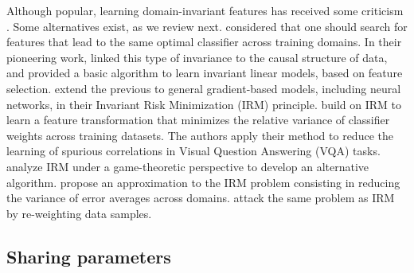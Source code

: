 \documentclass{article}
\begin{document}
Although popular, learning domain-invariant features has received some criticism \citep{zhao2019learning, johansson2019support}. Some alternatives exist, as we review next.
%
\citet{peters2016causal, rojas2018invariant} considered that one should search for features that lead to the same optimal classifier across training domains. In their pioneering work, \citet{peters2016causal} linked this type of invariance to the causal structure of data, and provided a basic algorithm to learn invariant linear models, based on feature selection.
%
\citet{arjovsky2019invariant} extend the previous to general gradient-based models, including neural networks, in their Invariant Risk Minimization (IRM) principle.
%
\citet{teney2020unshuffling} build on IRM to learn a feature transformation that minimizes the relative variance of classifier weights across training datasets. The authors apply their method to reduce the learning of spurious correlations in Visual Question Answering (VQA) tasks.
%
\citet{ahuja2020invariant} analyze IRM under a game-theoretic perspective to develop an alternative algorithm.
%
\citet{krueger2020out} propose an approximation to the IRM problem consisting in reducing the variance of error averages across domains.
%
\citet{bouvier2019hidden} attack the same problem as IRM by re-weighting data samples.

\subsection{Sharing parameters}
\end{document}
